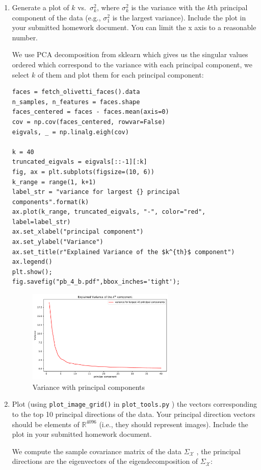 \documentclass[12pt,twoside]{article}
\begin{document}
\begin{enumerate}
\begin{enumerate}
\item Generate a plot of $k$ vs.~$\sigma^2_k$, where $\sigma^2_k$ is
the variance  with the $k$th principal component of the data (e.g., $\sigma^2_1$
is the largest variance). 
Include
the plot in your submitted homework document. You can limit the x axis to a reasonable number.

We use PCA decomposition from sklearn which gives us the singular values ordered which correspond to the variance with each principal component, we select $k$ of them
and plot them for each principal component:
\begin{verbatim}
faces = fetch_olivetti_faces().data
n_samples, n_features = faces.shape
faces_centered = faces - faces.mean(axis=0)
cov = np.cov(faces_centered, rowvar=False)
eigvals, _ = np.linalg.eigh(cov)

k = 40
truncated_eigvals = eigvals[::-1][:k]
fig, ax = plt.subplots(figsize=(10, 6))
k_range = range(1, k+1)
label_str = "variance for largest {} principal components".format(k)
ax.plot(k_range, truncated_eigvals, "-", color="red", label=label_str)
ax.set_xlabel("principal component")
ax.set_ylabel("Variance")
ax.set_title(r"Explained Variance of the $k^{th}$ component")
ax.legend()
plt.show();
fig.savefig("pb_4_b.pdf",bbox_inches='tight');
\end{verbatim}

	\begin{figure}[H]
		\centering
		\includegraphics[width=200pt]{figures/pb_4_b.pdf}
		\caption{Variance with principal components}
		\label{fig6}
	\end{figure}

\item  Plot (using  \verb|plot_image_grid()| in
\verb|plot_tools.py| ) the vectors
corresponding to the top 10 principal directions of the data.
Your principal direction vectors should be elements of $\mathbb{R}^{4096}$ (i.e., they
should represent images).
Include the plot in your submitted homework document.

We compute the sample covariance matrix of the data $\Sigma_{\mathcal{X}}$ ,
 the principal directions are the eigenvectors of the eigendecomposition of  $\Sigma_{\mathcal{X}}$:
 

\end{enumerate}
\end{enumerate}
\end{document}
